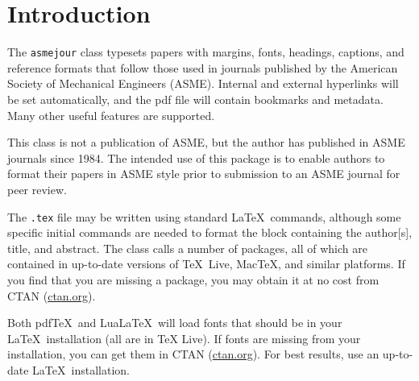 \documentclass[balance,nocopyright,upint,varvw,hyphenate,barcolor=Goldenrod3,german]{asmejour}%
\newcommand*\pdfTeX{pdf\TeX}
\newcommand*\LuaLaTeX{Lua\LaTeX}
\begin{document}
\date{Version \versionno, \today}%

\maketitle %



\section{Introduction}

The \texttt{asmejour} class typesets papers with margins, fonts, headings, captions, and reference formats that follow those used in journals published by the American Society of Mechanical Engineers (ASME). Internal and external hyperlinks will be set automatically, and the pdf file will contain bookmarks and metadata. Many other useful features are supported. 

This class is not a publication of ASME, but the author has published in ASME journals since 1984. The intended use of this package is to enable authors to format their papers in ASME style prior to submission to an ASME journal for peer review.

The \texttt{.tex} file may be written using standard \LaTeX\ commands, although some specific initial commands are needed to format the block containing the author[s], title, and abstract. The class calls a number of packages, all of which are contained in up-to-date versions of \TeX~Live, Mac\TeX, and similar platforms. If you find that you are missing a package, you may obtain it at no cost from CTAN (\href{http://ctan.org}{ctan.org}). 

Both \pdfTeX\ and \LuaLaTeX\ will load fonts that should be in your \LaTeX\ installation (all are in TeX Live).  If fonts are missing from your installation, you can get them in CTAN (\href{http://ctan.org}{ctan.org}).  For best results, use an up-to-date \LaTeX\ installation.
\end{document}
